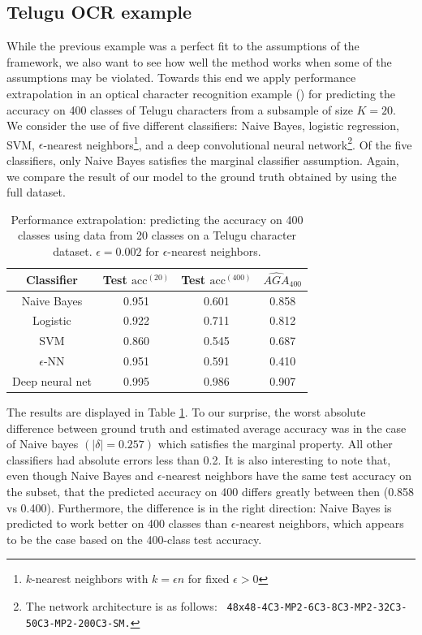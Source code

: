 \documentclass[12pt]{article}
\begin{document}
\subsection{Telugu OCR example}

While the previous example was a perfect fit to the assumptions of the
framework, we also want to see how well the method works when some of
the assumptions may be violated.  Towards this end we apply performance
extrapolation in an optical character recognition example
(\cite{achanta2015telugu}) for predicting the accuracy on 400 classes
of Telugu characters from a subsample of size $K = 20$.  We consider
the use of five different classifiers: Naive Bayes, logistic
regression, SVM, $\epsilon$-nearest neighbors\footnote{$k$-nearest
  neighbors with $k = \epsilon n$ for fixed $\epsilon > 0$}, and a
deep convolutional neural network\footnote{The network architecture is
  as follows: {\tt
    48x48-4C3-MP2-6C3-8C3-MP2-32C3-50C3-MP2-200C3-SM.}}.  Of the five
classifiers, only Naive Bayes satisfies the marginal classifier
assumption.  Again, we compare the result of our model to the ground
truth obtained by using the full dataset.

\begin{table}
\centering
\begin{tabular}{|c||c|c|c|}\hline
Classifier      & Test $\text{acc}^{(20)}$ & Test $\text{acc}^{(400)}$ & $\hat{AGA}_{400}$ \\ \hline
Naive Bayes     & 0.951                   & 0.601                   & 0.858     \\ \hline
Logistic        & 0.922                   & 0.711                   & 0.812     \\ \hline
SVM             & 0.860                   & 0.545                   & 0.687     \\ \hline
$\epsilon$-NN   & 0.951                   & 0.591                   & 0.410     \\ \hline
Deep neural net & 0.995                   & 0.986                   & 0.907     \\ \hline
\end{tabular}
\caption{Performance extrapolation: predicting the accuracy on 400 classes using data from 20 classes on a Telugu character dataset.
$\epsilon = 0.002$ for $\epsilon$-nearest neighbors.}
\label{tab:telugu}
\end{table}

The results are displayed in Table \ref{tab:telugu}.  To our surprise,
the worst absolute difference between ground truth and estimated
average accuracy was in the case of Naive bayes $(|\delta| = 0.257)$
which satisfies the marginal property.  All other classifiers had
absolute errors less than 0.2.  It is also interesting to note that,
even though Naive Bayes and $\epsilon$-nearest neighbors have the same
test accuracy on the subset, that the predicted accuracy on 400
differs greatly between then (0.858 vs 0.400).  Furthermore, the
difference is in the right direction: Naive Bayes is predicted to work
better on 400 classes than $\epsilon$-nearest neighbors, which appears
to be the case based on the 400-class test accuracy.
\end{document}
